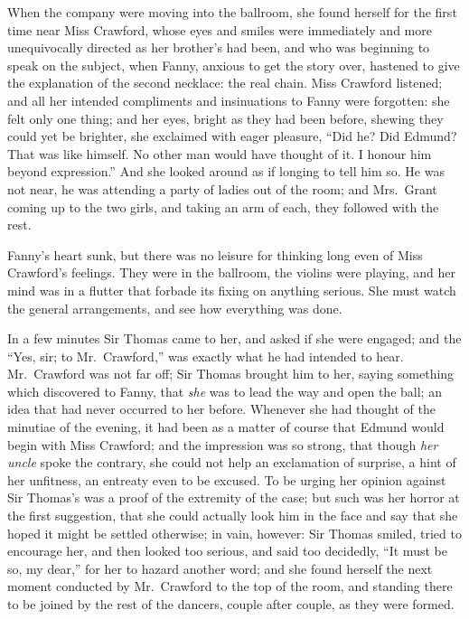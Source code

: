 When the company were moving into the ballroom, she found
herself for the first time near Miss Crawford, whose eyes
and smiles were immediately and more unequivocally directed
as her brother's had been, and who was beginning to speak
on the subject, when Fanny, anxious to get the story over,
hastened to give the explanation of the second necklace:
the real chain.  Miss Crawford listened; and all her intended
compliments and insinuations to Fanny were forgotten:
she felt only one thing; and her eyes, bright as they
had been before, shewing they could yet be brighter,
she exclaimed with eager pleasure, ``Did he?  Did Edmund?
That was like himself.  No other man would have thought of it.
I honour him beyond expression.''  And she looked around
as if longing to tell him so.  He was not near, he was
attending a party of ladies out of the room; and Mrs.\ Grant
coming up to the two girls, and taking an arm of each,
they followed with the rest.

Fanny's heart sunk, but there was no leisure for
thinking long even of Miss Crawford's feelings.
They were in the ballroom, the violins were playing,
and her mind was in a flutter that forbade its fixing on
anything serious.  She must watch the general arrangements,
and see how everything was done.

In a few minutes Sir Thomas came to her, and asked if
she were engaged; and the ``Yes, sir; to Mr.\ Crawford,''
was exactly what he had intended to hear.  Mr.\ Crawford
was not far off; Sir Thomas brought him to her,
saying something which discovered to Fanny, that \emph{she}
was to lead the way and open the ball; an idea that had
never occurred to her before.  Whenever she had thought
of the minutiae of the evening, it had been as a matter
of course that Edmund would begin with Miss Crawford;
and the impression was so strong, that though \emph{her} \emph{uncle}
spoke the contrary, she could not help an exclamation
of surprise, a hint of her unfitness, an entreaty even to
be excused.  To be urging her opinion against Sir Thomas's
was a proof of the extremity of the case; but such was her
horror at the first suggestion, that she could actually
look him in the face and say that she hoped it might be
settled otherwise; in vain, however:  Sir Thomas smiled,
tried to encourage her, and then looked too serious,
and said too decidedly, ``It must be so, my dear,'' for her
to hazard another word; and she found herself the next
moment conducted by Mr.\ Crawford to the top of the room,
and standing there to be joined by the rest of the dancers,
couple after couple, as they were formed.

